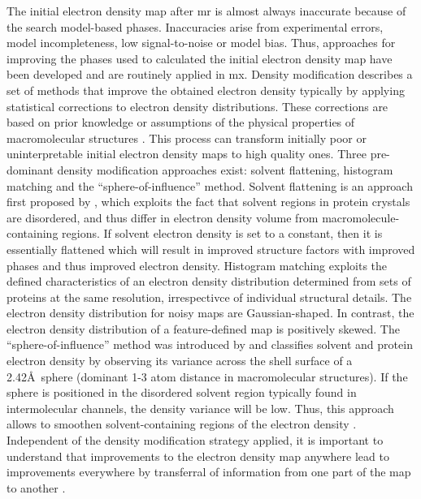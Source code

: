 The initial electron density map after \gls{mr} is almost always inaccurate because of the search model-based phases. Inaccuracies arise from experimental errors, model incompleteness, low signal-to-noise or model bias. Thus, approaches for improving the phases used to calculated the initial electron density map have been developed and are routinely applied in \gls{mx}. Density modification describes a set of methods that improve the obtained electron density typically by applying statistical corrections to electron density distributions. These corrections are based on prior knowledge or assumptions of the physical properties of macromolecular structures \cite{Rupp2010-nc}. This process can transform initially poor or uninterpretable initial electron density maps to high quality ones. Three pre-dominant density modification approaches exist: solvent flattening, histogram matching and the ``sphere-of-influence'' method. Solvent flattening is an approach first proposed by \textcite{Wang1985-zu}, which exploits the fact that solvent regions in protein crystals are disordered, and thus differ in electron density volume from macromolecule-containing regions. If solvent electron density is set to a constant, then it is essentially flattened which will result in improved structure factors with improved phases and thus improved electron density. Histogram matching \cite{Lunin1988-lx} exploits the defined characteristics of an electron density distribution determined from sets of proteins at the same resolution, irrespectivce of individual structural details. The electron density distribution for noisy maps are Gaussian-shaped. In contrast, the electron density distribution of a feature-defined map is positively skewed. The ``sphere-of-influence'' method was introduced by \textcite{Sheldrick2002-tx} and classifies solvent and protein electron density by observing its variance across the shell surface of a 2.42\AA\ sphere (dominant 1-3 atom distance in macromolecular structures). If the sphere is positioned in the disordered solvent region typically found in intermolecular channels, the density variance will be low. Thus, this approach allows to smoothen solvent-containing regions of the electron density \cite{Sheldrick2002-tx}. Independent of the density modification strategy applied, it is important to understand that improvements to the electron density map anywhere lead to improvements everywhere by transferral of information from one part of the map to another \cite{Terwilliger2000-sz}.

